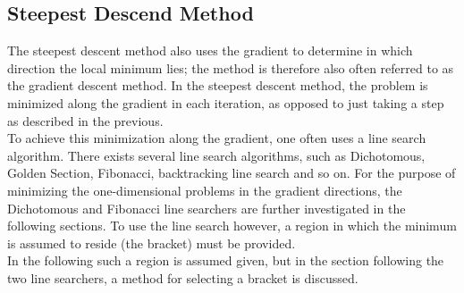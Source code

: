 \subsection{Steepest Descend Method}
The steepest descent method also uses the gradient to determine in which direction the local minimum lies; the method is therefore also often referred to as the gradient descent method. In the steepest descent method, the problem is minimized along the gradient in each iteration, as opposed to just taking a step as described in the previous.\\
To achieve this minimization along the gradient, one often uses a line search algorithm. There exists several line search algorithms, such as Dichotomous, Golden Section, Fibonacci, backtracking line search and so on. For the purpose of minimizing the one-dimensional problems in the gradient directions, the Dichotomous and Fibonacci line searchers are further investigated in the following sections. To use the line search however, a region in which the minimum is assumed to reside (the bracket) must be provided.\cite{AAntoniou}\\
In the following such a region is assumed given, but in the section following the two line searchers, a method for selecting a bracket is discussed.

